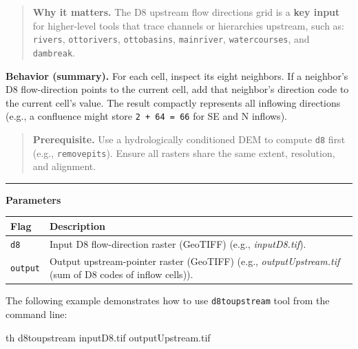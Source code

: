 \documentclass[
]{book}
\newenvironment{Shaded}{\begin{snugshade}}{\end{snugshade}}
\newcommand{\ExtensionTok}[1]{#1}
\newcommand{\NormalTok}[1]{#1}
\begin{document}
\begin{quote}
\textbf{Why it matters.} The D8 upstream flow directions grid is a \textbf{key input} for higher-level tools that trace channels or hierarchies upstream, such as: \texttt{rivers}, \texttt{ottorivers}, \texttt{ottobasins}, \texttt{mainriver}, \texttt{watercourses}, and \texttt{dambreak}.
\end{quote}

\textbf{Behavior (summary).}
For each cell, inspect its eight neighbors. If a neighbor's D8 flow-direction points to the current cell, add that neighbor's direction code to the current cell's value. The result compactly represents all inflowing directions (e.g., a confluence might store \texttt{2\ +\ 64\ =\ 66} for SE and N inflows).

\begin{quote}
\textbf{Prerequisite.} Use a hydrologically conditioned DEM to compute \texttt{d8} first (e.g., \texttt{removepits}). Ensure all rasters share the same extent, resolution, and alignment.
\end{quote}

\begin{center}\rule{0.5\linewidth}{0.5pt}\end{center}

\textbf{Parameters}

\begin{longtable}[]{@{}
  >{\raggedright\arraybackslash}p{}
  >{\raggedright\arraybackslash}p{}@{}}
\toprule\noalign{}
\begin{minipage}[b]{\linewidth}\raggedright
Flag
\end{minipage} & \begin{minipage}[b]{\linewidth}\raggedright
Description
\end{minipage} \\
\midrule\noalign{}
\endhead
\bottomrule\noalign{}
\endlastfoot
\texttt{d8} & Input D8 flow-direction raster (GeoTIFF) (e.g., \emph{inputD8.tif}). \\
\texttt{output} & Output upstream-pointer raster (GeoTIFF) (e.g., \emph{outputUpstream.tif} (sum of D8 codes of inflow cells)). \\
\end{longtable}

The following example demonstrates how to use \texttt{d8toupstream} tool from the command line:

\begin{Shaded}
\begin{Highlighting}[]
\ExtensionTok{th}\NormalTok{ d8toupstream inputD8.tif outputUpstream.tif}
\end{Highlighting}
\end{Shaded}
\end{document}
